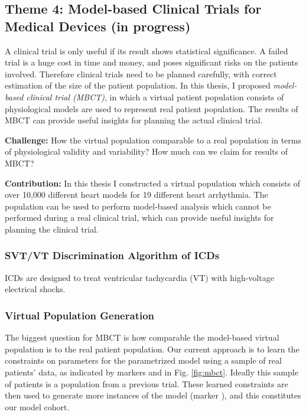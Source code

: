 \documentclass[a4paper,11pt]{article}
\newcommand*\circled[1]{\tikz[baseline=(char.base)]{
		\node[shape=circle,draw,inner sep=2pt] (char) {#1};}}
\begin{document}
\subsection{Theme 4: Model-based Clinical Trials for Medical Devices (in progress)}
A clinical trial is only useful if its result shows statistical significance.
A failed trial is a huge cost in time and money, and poses significant risks on the patients involved.
Therefore clinical trials need to be planned carefully, with correct estimation of the size of the patient population.
In this thesis, I proposed \emph{model-based clinical trial (MBCT)}, in which a virtual patient population consists of physiological models are used to represent  real patient population. 
The results of MBCT can provide useful insights for planning the actual clinical trial.


\noindent\textbf{Challenge:} How the virtual population comparable to a real population in terms of physiological validity and variability? How much can we claim for results of MBCT?

\noindent\textbf{Contribution:} In this thesis I constructed a virtual population which consists of over 10,000 different heart models for 19 different heart arrhythmia.
The population can be used to perform model-based analysis which cannot be performed during a real clinical trial, which can provide useful insights for planning the clinical trial.

\subsubsection{SVT/VT Discrimination Algorithm of ICDs}
ICDs are designed to treat ventricular tachycardia (VT) with high-voltage electrical shocks.

\subsubsection{Virtual Population Generation}
The biggest question for MBCT is how comparable the model-based virtual population is to the real patient population. 
Our current approach is to learn the constraints on parameters for the parametrized model using a sample of real patients' data, as indicated by markers \circled{1} and \circled{2} in Fig. \ref{fig:mbct}. 
Ideally this sample of patients is a population from a previous trial.
These learned constraints are then used to generate more instances of the model (marker \circled{3}), and this constitutes our model cohort.
\end{document}
